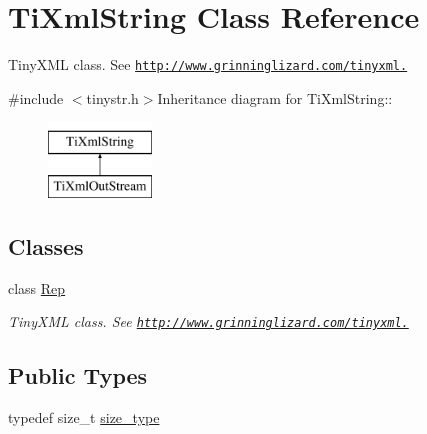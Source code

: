 \hypertarget{class_ti_xml_string}{
\section{TiXmlString Class Reference}
\label{class_ti_xml_string}
}


TinyXML class. See \href{http://www.grinninglizard.com/tinyxml.}{\tt http://www.grinninglizard.com/tinyxml.}  


{\ttfamily \#include $<$tinystr.h$>$}Inheritance diagram for TiXmlString::\begin{figure}[H]
\begin{center}
\leavevmode
\includegraphics[height=2cm]{class_ti_xml_string}
\end{center}
\end{figure}
\subsection*{Classes}
\begin{DoxyCompactItemize}
\item 
class \hyperlink{struct_ti_xml_string_1_1_rep}{Rep}
\begin{DoxyCompactList}\small\item\em TinyXML class. See \href{http://www.grinninglizard.com/tinyxml.}{\tt http://www.grinninglizard.com/tinyxml.} \item\end{DoxyCompactList}\end{DoxyCompactItemize}
\subsection*{Public Types}
\begin{DoxyCompactItemize}
\item 
typedef size\_\-t \hyperlink{class_ti_xml_string_abeb2c1893a04c17904f7c06546d0b971}{size\_\-type}
\end{DoxyCompactItemize}
